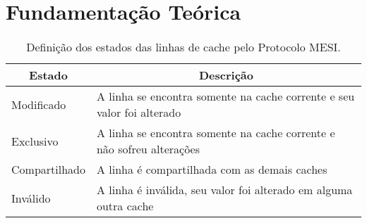 \chapter[Fundamentação Teórica]{Fundamentação Teórica}
\label{chap:fundamentacao}

\lipsum[4 - 6]

\begin{table}[t]
	\centering
 	\caption{Definição dos estados das linhas de cache pelo Protocolo MESI.}
 	\label{tab:mesi}
	\begin{tabular}{|l|l|}
	\hline
	\multicolumn{1}{|c|}{\textbf{Estado}} & \multicolumn{1}{c|}{\textbf{Descrição}}         \\ \hline
	Modificado 		& A linha se encontra somente na cache corrente e seu valor foi alterado  \\ \hline
	Exclusivo  		& A linha se encontra somente na cache corrente e não sofreu alterações   \\ \hline
	Compartilhado & A linha é compartilhada com as demais caches	                          \\ \hline
	Inválido      & A linha é inválida, seu valor foi alterado em alguma outra cache        \\ \hline
	\end{tabular}
\end{table}

\lipsum[7 - 10]
